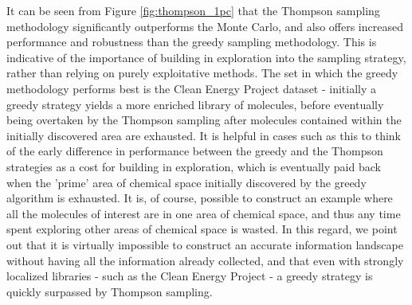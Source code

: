 \documentclass{pnastwo}
\begin{document}
\begin{article}
It can be seen from Figure \ref{fig:thompson_1pc} that the Thompson sampling methodology significantly outperforms the Monte Carlo, and also offers increased performance and robustness than the greedy sampling methodology.  This is indicative of the importance of building in exploration into the sampling strategy, rather than relying on purely exploitative methods.  The set in which the greedy methodology performs best is the Clean Energy Project dataset - initially a greedy strategy yields a more enriched library of molecules, before eventually being overtaken by the Thompson sampling after molecules contained within the initially discovered area are exhausted.  It is helpful in cases such as this to think of the early difference in performance between the greedy and the Thompson strategies as a cost for building in exploration, which is eventually paid back when the 'prime' area of chemical space initially discovered by the greedy algorithm is exhausted.  It is, of course, possible to construct an example where all the molecules of interest are in one area of chemical space, and thus any time spent exploring other areas of chemical space is wasted.  In this regard, we point out that it is virtually impossible to construct an accurate information landscape without having all the information already collected, and that even with strongly localized libraries - such as the Clean Energy Project - a greedy strategy is quickly surpassed by Thompson sampling. 
  

\end{article}
\end{document}
